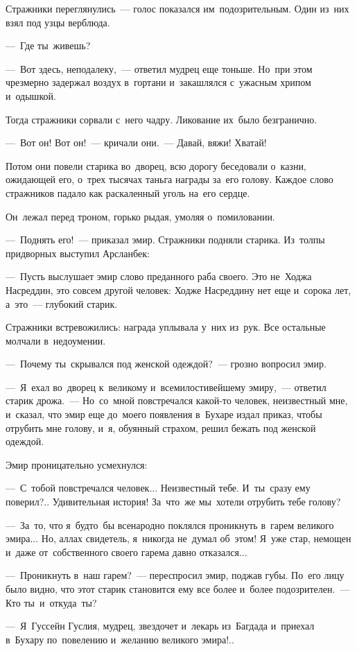 \documentclass[12pt,a4paper]{book}
\begin{document}
Стражники переглянулись~— голос показался им~подозрительным. Один из~них взял под узцы верблюда.

—~Где ты~живешь?

—~Вот здесь, неподалеку,~— ответил мудрец еще тоньше. Но~при этом чрезмерно задержал воздух в~гортани и~закашлялся с~ужасным хрипом и~одышкой.

Тогда стражники сорвали с~него чадру. Ликование их~было безгранично.

—~Вот он! Вот он!~— кричали они.~— Давай, вяжи! Хватай!

Потом они повели старика во~дворец, всю дорогу беседовали о~казни, ожидающей его, о~трех тысячах таньга награды за~его голову. Каждое слово стражников падало как раскаленный уголь на~его сердце.

Он~лежал перед троном, горько рыдая, умоляя о~помиловании.

—~Поднять его!~— приказал эмир. Стражники подняли старика. Из~толпы придворных выступил Арсланбек:

—~Пусть выслушает эмир слово преданного раба своего. Это не~Ходжа Насреддин, это совсем другой человек: Ходже Насреддину нет еще и~сорока лет, а~это~— глубокий старик.

Стражники встревожились: награда уплывала у~них из~рук. Все остальные молчали в~недоумении.

—~Почему ты~скрывался под женской одеждой?~— грозно вопросил эмир.

—~Я~ехал во~дворец к~великому и~всемилостивейшему эмиру,~— ответил старик дрожа.~— Но~со~мной повстречался какой-то человек, неизвестный мне, и~сказал, что эмир еще до~моего появления в~Бухаре издал приказ, чтобы отрубить мне голову, и~я, обуянный страхом, решил бежать под женской одеждой.

Эмир проницательно усмехнулся:

—~С~тобой повстречался человек... Неизвестный тебе. И~ты~сразу ему поверил?.. Удивительная история! За~что~же мы~хотели отрубить тебе голову?

—~За~то, что я~будто~бы всенародно поклялся проникнуть в~гарем великого эмира... Но, аллах свидетель, я~никогда не~думал об~этом! Я~уже стар, немощен и~даже от~собственного своего гарема давно отказался...

—~Проникнуть в~наш гарем?~— переспросил эмир, поджав губы. По~его лицу было видно, что этот старик становится ему все более и~более подозрителен.~— Кто ты~и~откуда~ты?

—~Я~Гуссейн Гуслия, мудрец, звездочет и~лекарь из~Багдада и~приехал в~Бухару по~повелению и~желанию великого эмира!..
\end{document}
